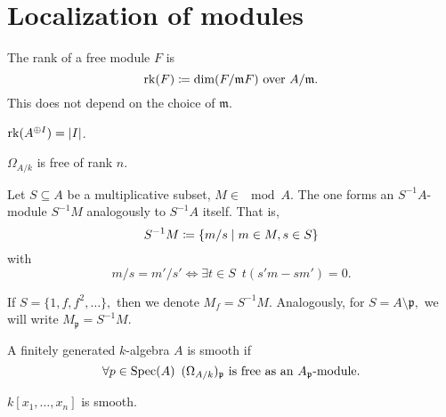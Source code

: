 \section{Localization of modules}

\begin{df}
  The rank of a free module $F$ is
  \[ \operatorname*{rk}(F) \coloneqq \dim(F / {\mathfrak m F}) \text{ over } A /{\mathfrak m}.\]
  This does not depend on the choice of $\mathfrak m$.
\end{df}

\begin{example}
  $ \operatorname*{rk}(A^{\oplus I}) = \lvert I\rvert$.
\end{example}

\begin{example}
  $\Omega_{A/{k}}$ is free of rank $n$.
\end{example}

\begin{df}
  Let $S \subseteq A$ be a multiplicative subset, $M \in \mod{A}$. The one forms an $S^{-1}A$-module $S^{-1}M$ analogously to $S^{-1}A$ itself. That is,
  \[ S^{-1}M \coloneqq \{ m / {s} \mathrel{|} m \in M, s \in S\}\]
  with
  \[ m / {s} = m' / {s'} \iff \exists t \in S \enspace t(s'm - sm') = 0.\]
\end{df}

\begin{example}
  If
  \( S = \{1, f, f^2, \dotsc \},\)
  then we denote
  \( M_f = S^{-1}M.\)
  Analogously, for
  \( S = A \setminus \mathfrak p,\)
  we will write
  \(M_{\mathfrak p} = S^{-1}M.\)
\end{example}

\begin{df}
  A finitely generated $k$-algebra $A$ is smooth if
  \[ \forall p \in \text{Spec}(A) \enspace (\Omega_{A/{k}})_{\mathfrak p} \text{ is free as an $A_{\mathfrak p}$-module}.\]
\end{df}


\begin{example}
  $k[x_1, \dotsc, x_n]$ is smooth.
\end{example}

